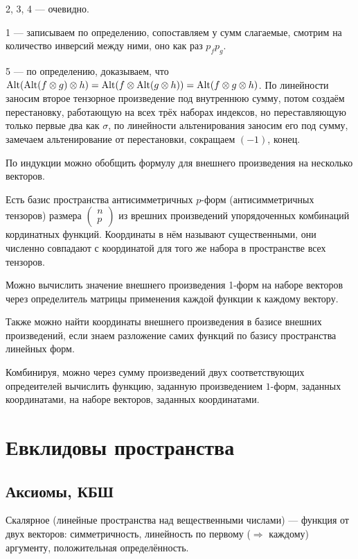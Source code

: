 \documentclass[12pt, a4paper]{article}
\begin{document}
2, 3, 4 — очевидно.

1 — записываем по определению, сопоставляем у сумм слагаемые, 
смотрим на количество инверсий между ними, оно как раз $p_f p_g$.

5 — по определению, доказываем, что $\operatorname{Alt}(\operatorname{Alt}(f \otimes g) \otimes h) = \operatorname{Alt}(f \otimes \operatorname{Alt}(g \otimes h)) = \operatorname{Alt}(f \otimes g \otimes h)$.
По линейности заносим второе тензорное произведение под внутреннюю сумму, 
потом создаём перестановку, работающую на всех трёх наборах индексов, но переставляющую только первые два как $\sigma$,
по линейности альтенирования заносим его под сумму, замечаем альтенирование от перестановки, сокращаем $(-1)$, конец.

По индукции можно обобщить формулу для внешнего произведения на несколько векторов.


Есть базис пространства антисимметричных $p$-форм (антисимметричных тензоров) 
размера $\begin{pmatrix} n \\ p \end{pmatrix}$ из врешних произведений 
упорядоченных комбинаций кординатных функций. 
Координаты в нём называют существенными, они численно совпадают 
с координатой для того же набора в пространстве всех тензоров.


Можно вычислить значение внешнего произведения 1-форм на наборе векторов через определитель 
матрицы применения каждой функции к каждому вектору.

Также можно найти координаты внешнего произведения в базисе внешних произведений, 
если знаем разложение самих функций по базису пространства линейных форм.

Комбинируя, можно через сумму произведений двух соответствующих опредеителей 
вычислить функцию, заданную произведением $1$-форм, заданных координатами, 
на наборе векторов, заданных координатами.


\section{Евклидовы пространства}

\subsection{Аксиомы, КБШ}

Скалярное (линейные пространства над вещественными числами) — функция от двух векторов: 
симметричность, линейность по первому ($\Rightarrow$ каждому) аргументу, 
положительная определённость.
\end{document}
